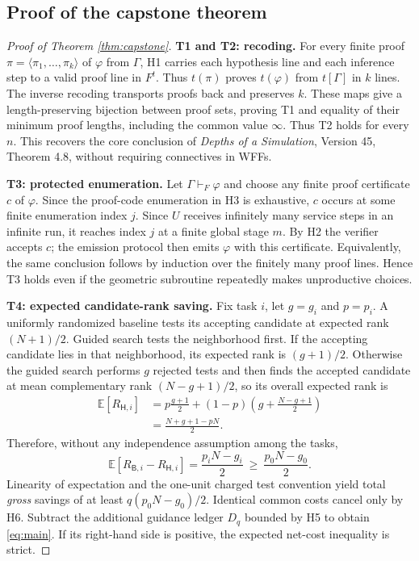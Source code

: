 \documentclass[11pt,letterpaper]{article}
\theoremstyle{definition}
\theoremstyle{remark}
\newcommand{\E}{\mathbb{E}}
\newcommand{\Hsys}{\mathsf H}
\newcommand{\Bsys}{\mathsf B}
\begin{document}
\subsection{Proof of the capstone theorem}
\begin{proof}[Proof of Theorem \ref{thm:capstone}]
\textbf{T1 and T2: recoding.}
For every finite proof $\pi=\langle\pi_1,\dots,\pi_k\rangle$ of $\varphi$ from $\Gamma$, H1 carries each hypothesis line and each inference step to a valid proof line in $F^t$. Thus $t(\pi)$ proves $t(\varphi)$ from $t[\Gamma]$ in $k$ lines. The inverse recoding transports proofs back and preserves $k$. These maps give a length-preserving bijection between proof sets, proving T1 and equality of their minimum proof lengths, including the common value $\infty$. Thus T2 holds for every $n$. This recovers the core conclusion of \emph{Depths of a Simulation}, Version 45, Theorem 4.8, without requiring connectives in WFFs.

\medskip\noindent\textbf{T3: protected enumeration.}
Let $\Gamma\vdash_F\varphi$ and choose any finite proof certificate $c$ of $\varphi$. Since the proof-code enumeration in H3 is exhaustive, $c$ occurs at some finite enumeration index $j$. Since $U$ receives infinitely many service steps in an infinite run, it reaches index $j$ at a finite global stage $m$. By H2 the verifier accepts $c$; the emission protocol then emits $\varphi$ with this certificate. Equivalently, the same conclusion follows by induction over the finitely many proof lines. Hence T3 holds even if the geometric subroutine repeatedly makes unproductive choices.

\medskip\noindent\textbf{T4: expected candidate-rank saving.}
Fix task $i$, let $g=g_i$ and $p=p_i$. A uniformly randomized baseline tests its accepting candidate at expected rank $(N+1)/2$. Guided search tests the neighborhood first. If the accepting candidate lies in that neighborhood, its expected rank is $(g+1)/2$. Otherwise the guided search performs $g$ rejected tests and then finds the accepted candidate at mean complementary rank $(N-g+1)/2$, so its overall expected rank is
\begin{align*}
 \E[R_{\Hsys,i}]&=p\frac{g+1}{2}+(1-p)\left(g+\frac{N-g+1}{2}\right)\\
 &=\frac{N+g+1-pN}{2}.
\end{align*}
Therefore, without any independence assumption among the tasks,
\[
 \E[R_{\Bsys,i}-R_{\Hsys,i}]=\frac{p_iN-g_i}{2}\ \ge\ \frac{p_0N-g_0}{2}.
\]
Linearity of expectation and the one-unit charged test convention yield total \emph{gross} savings of at least $q(p_0N-g_0)/2$. Identical common costs cancel only by H6. Subtract the additional guidance ledger $D_q$ bounded by H5 to obtain \eqref{eq:main}. If its right-hand side is positive, the expected net-cost inequality is strict.


\end{proof}
\end{document}
